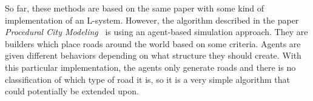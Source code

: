 So far, these methods are based on the same paper with some kind of implementation of an L-system.
However, the algorithm described in the paper \textit{Procedural City Modeling}~\cite{citygen_lechner} is using an agent-based simulation approach. They are builders which place roads around the world based on some criteria. Agents are given different behaviors depending on what structure they should create.
With this particular implementation, the agents only generate roads and there is no classification of which type of road it is, so it is a very simple algorithm that could potentially be extended upon.

